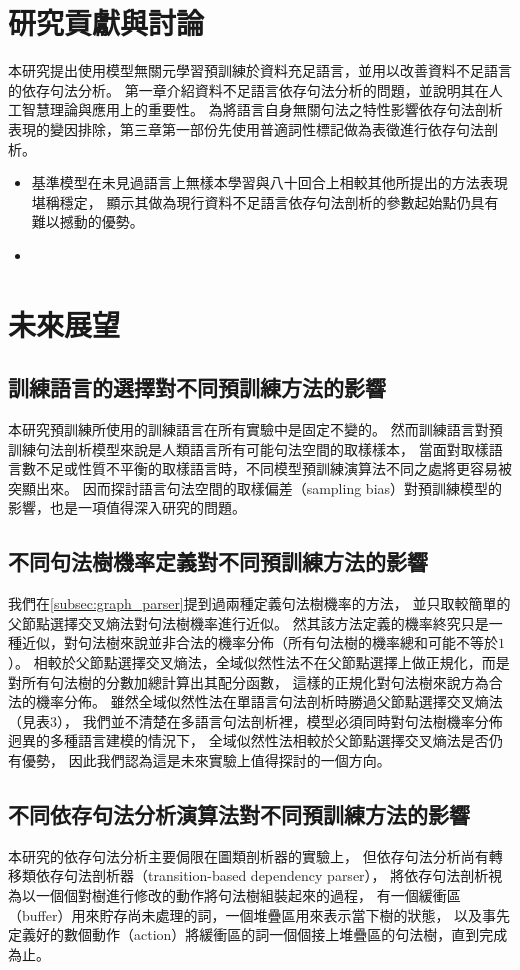 \section{研究貢獻與討論}
本研究提出使用模型無關元學習預訓練於資料充足語言，並用以改善資料不足語言的依存句法分析。
第一章介紹資料不足語言依存句法分析的問題，並說明其在人工智慧理論與應用上的重要性。
為將語言自身無關句法之特性影響依存句法剖析表現的變因排除，第三章第一部份先使用普適詞性標記做為表徵進行依存句法剖析。
\begin{itemize}
    \item 基準模型在未見過語言上無樣本學習與八十回合上相較其他所提出的方法表現堪稱穩定，
顯示其做為現行資料不足語言依存句法剖析的參數起始點仍具有難以撼動的優勢。
    \item 
\end{itemize}
\section{未來展望}
\subsection{訓練語言的選擇對不同預訓練方法的影響}
本研究預訓練所使用的訓練語言在所有實驗中是固定不變的。
然而訓練語言對預訓練句法剖析模型來說是人類語言所有可能句法空間的取樣樣本，
當面對取樣語言數不足或性質不平衡的取樣語言時，不同模型預訓練演算法不同之處將更容易被突顯出來。
因而探討語言句法空間的取樣偏差（sampling bias）對預訓練模型的影響，也是一項值得深入研究的問題。
\subsection{不同句法樹機率定義對不同預訓練方法的影響}
我們在\ref{subsec:graph_parser}提到過兩種定義句法樹機率的方法，
並只取較簡單的父節點選擇交叉熵法對句法樹機率進行近似。
然其該方法定義的機率終究只是一種近似，對句法樹來說並非合法的機率分佈（所有句法樹的機率總和可能不等於$1$）。
相較於父節點選擇交叉熵法，全域似然性法不在父節點選擇上做正規化，而是對所有句法樹的分數加總計算出其配分函數，
這樣的正規化對句法樹來說方為合法的機率分佈。
雖然全域似然性法在單語言句法剖析時勝過父節點選擇交叉熵法（見\cite{ma-hovy-2017-neural}表3），
我們並不清楚在多語言句法剖析裡，模型必須同時對句法樹機率分佈迥異的多種語言建模的情況下，
全域似然性法相較於父節點選擇交叉熵法是否仍有優勢，
因此我們認為這是未來實驗上值得探討的一個方向。

\subsection{不同依存句法分析演算法對不同預訓練方法的影響}
本研究的依存句法分析主要侷限在圖類剖析器的實驗上，
但依存句法分析尚有轉移類依存句法剖析器（transition-based dependency parser），
將依存句法剖析視為以一個個對樹進行修改的動作將句法樹組裝起來的過程，
有一個緩衝區（buffer）用來貯存尚未處理的詞，一個堆疊區用來表示當下樹的狀態，
以及事先定義好的數個動作（action）將緩衝區的詞一個個接上堆疊區的句法樹，直到完成為止。

